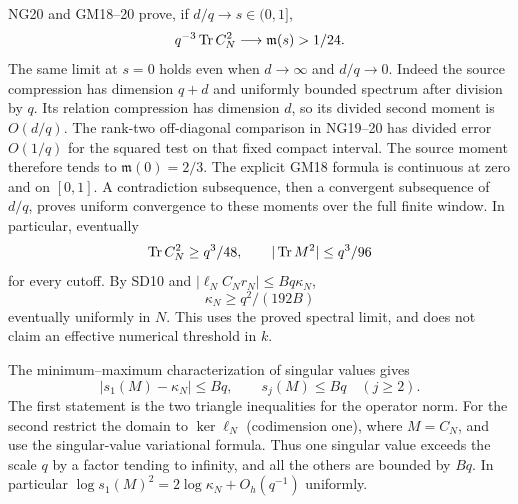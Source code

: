 NG20 and GM18--20 prove, if $d/q\to s\in(0,1]$,
\[
q^{-3}\operatorname{Tr} C_N^2\longrightarrow\mathfrak m(s)>1/24.
\]
The same limit at $s=0$ holds even when $d\to\infty$ and $d/q\to0$.
Indeed the source compression has dimension $q+d$ and uniformly
bounded spectrum after division by $q$. Its relation compression has
dimension $d$, so its divided second moment is $O(d/q)$. The rank-two
off-diagonal comparison in NG19--20 has divided error $O(1/q)$ for
the squared test on that fixed compact interval. The source moment
therefore tends to $\mathfrak m(0)=2/3$. The explicit GM18 formula
is continuous at zero and on $[0,1]$. A contradiction subsequence,
then a convergent subsequence of $d/q$, proves uniform convergence to
these moments over the full finite window. In particular, eventually
\[
\operatorname{Tr} C_N^2\ge q^3/48,\qquad |\operatorname{Tr} M^2|\le q^3/96
\]
for every cutoff. By SD10 and $|\ell_N C_Nr_N|\le Bq\kappa_N$,
\begin{equation}\tag{SD11}
\boxed{\kappa_N\ge q^2/(192B)}
\end{equation}
eventually uniformly in $N$. This uses the proved spectral limit, and
does not claim an effective numerical threshold in $k$.

The minimum--maximum characterization of singular values gives
\begin{equation}\tag{SD12}
|s_1(M)-\kappa_N|\le Bq,\qquad s_j(M)\le Bq\quad(j\ge2).
\end{equation}
The first statement is the two triangle inequalities for the operator
norm. For the second restrict the domain to $\ker\ell_N$ (codimension
one), where $M=C_N$, and use the singular-value variational formula.
Thus one singular value exceeds the scale $q$ by a factor tending to
infinity, and all the others are bounded by $Bq$. In particular
$\log s_1(M)^2=2\log\kappa_N+O_h(q^{-1})$ uniformly.


